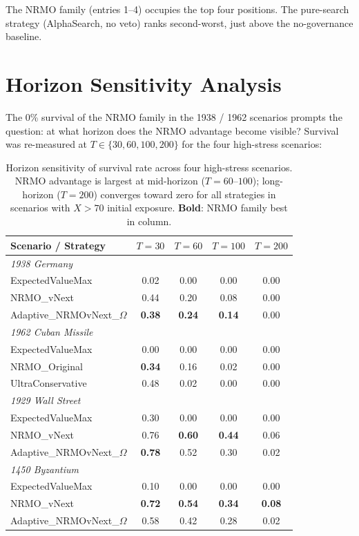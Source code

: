 The NRMO family (entries 1--4) occupies the top four positions.
The pure-search strategy (AlphaSearch, no veto) ranks second-worst,
just above the no-governance baseline.

\section{Horizon Sensitivity Analysis}
\label{sec:hist-horizon-sensitivity}

The 0\% survival of the NRMO family in the 1938 / 1962 scenarios
prompts the question: at what horizon does the NRMO advantage
become visible? Survival was re-measured at $T \in \{30, 60, 100,
200\}$ for the four high-stress scenarios:

\begin{table}[ht]
\centering
\small
\begin{tabularx}{\linewidth}{Xcccc}
\toprule
\textbf{Scenario / Strategy} & \textbf{$T = 30$} & \textbf{$T = 60$} & \textbf{$T = 100$} & \textbf{$T = 200$} \\
\midrule
\multicolumn{5}{l}{\textit{1938 Germany}} \\
ExpectedValueMax              & 0.02 & 0.00 & 0.00 & 0.00 \\
NRMO\_vNext                   & 0.44 & 0.20 & 0.08 & 0.00 \\
Adaptive\_NRMOvNext\_$\Omega$ & \textbf{0.38} & \textbf{0.24} & \textbf{0.14} & 0.00 \\
\midrule
\multicolumn{5}{l}{\textit{1962 Cuban Missile}} \\
ExpectedValueMax              & 0.00 & 0.00 & 0.00 & 0.00 \\
NRMO\_Original                & \textbf{0.34} & 0.16 & 0.02 & 0.00 \\
UltraConservative             & 0.48 & 0.02 & 0.00 & 0.00 \\
\midrule
\multicolumn{5}{l}{\textit{1929 Wall Street}} \\
ExpectedValueMax              & 0.30 & 0.00 & 0.00 & 0.00 \\
NRMO\_vNext                   & 0.76 & \textbf{0.60} & \textbf{0.44} & 0.06 \\
Adaptive\_NRMOvNext\_$\Omega$ & \textbf{0.78} & 0.52 & 0.30 & 0.02 \\
\midrule
\multicolumn{5}{l}{\textit{1450 Byzantium}} \\
ExpectedValueMax              & 0.10 & 0.00 & 0.00 & 0.00 \\
NRMO\_vNext                   & \textbf{0.72} & \textbf{0.54} & \textbf{0.34} & \textbf{0.08} \\
Adaptive\_NRMOvNext\_$\Omega$ & 0.58 & 0.42 & 0.28 & 0.02 \\
\bottomrule
\end{tabularx}
\caption[Horizon sensitivity]{Horizon sensitivity of survival rate
across four high-stress scenarios. NRMO advantage is largest at
mid-horizon ($T = 60$--$100$); long-horizon ($T = 200$) converges
toward zero for all strategies in scenarios with $X > 70$ initial
exposure. \textbf{Bold}: NRMO family best in column.}
\label{tab:hist-horizon-sensitivity}
\end{table}

